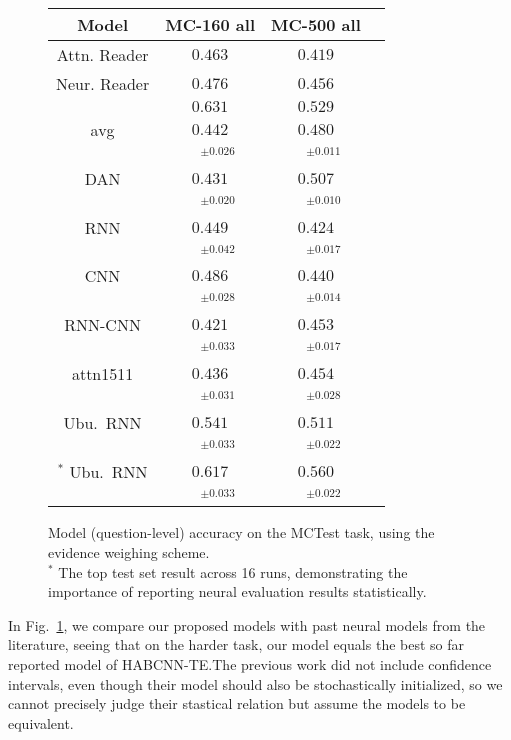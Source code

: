 \documentclass[11pt]{article}
\begin{document}
\begin{figure}[t]
\centering
\setlength{\tabcolsep}{3pt}
\begin{tabular}{|c|c|c|c|}
\hline
Model              & MC-160 all & MC-500 all \\
\hline
Attn. Reader & $0.463$ & $0.419$\\
Neur. Reader & $0.476$ & $0.456$\\
\cite{HABCNN} & $0.631$ & $0.529$\\
\hline
avg & $0.442$ & $0.480$\\
 & $\quad^{\pm0.026}$ & $\quad^{\pm0.011}$\\
DAN & $0.431$ & $0.507$\\
 & $\quad^{\pm0.020}$ & $\quad^{\pm0.010}$\\
\hline
RNN & $0.449$ & $0.424$\\
 & $\quad^{\pm0.042}$ & $\quad^{\pm0.017}$\\
CNN & $0.486$ & $0.440$\\
 & $\quad^{\pm0.028}$ & $\quad^{\pm0.014}$\\
RNN-CNN & $0.421$ & $0.453$\\
 & $\quad^{\pm0.033}$ & $\quad^{\pm0.017}$\\
attn1511 & $0.436$ & $0.454$\\
 & $\quad^{\pm0.031}$ & $\quad^{\pm0.028}$\\
Ubu.\ RNN & $0.541$ & $0.511$\\
 & $\quad^{\pm0.033}$ & $\quad^{\pm0.022}$\\
\hline
$^*$ Ubu.\ RNN & $0.617$ & $0.560$\\
 & $\quad^{\pm0.033}$ & $\quad^{\pm0.022}$\\
\hline
\end{tabular}
\setlength{\tabcolsep}{6pt}
\vspace*{-0.2cm}
\caption{\footnotesize%
	Model (question-level) accuracy on the MCTest task, using the evidence weighing scheme. \\
	$^*$ The top test set result across 16 runs, demonstrating the importance
	of reporting neural evaluation results statistically.
}
\label{tab:mctest}
\end{figure}

In Fig.~\ref{tab:mctest}, we compare our proposed models with past neural models
from the literature, seeing that on the harder task, our model equals the best
so far reported \cite{HABCNN} model of HABCNN-TE.\@  The previous work did not include
confidence intervals, even though their model should also be stochastically initialized,
so we cannot precisely judge their stastical relation but assume the models
to be equivalent.
\end{document}
